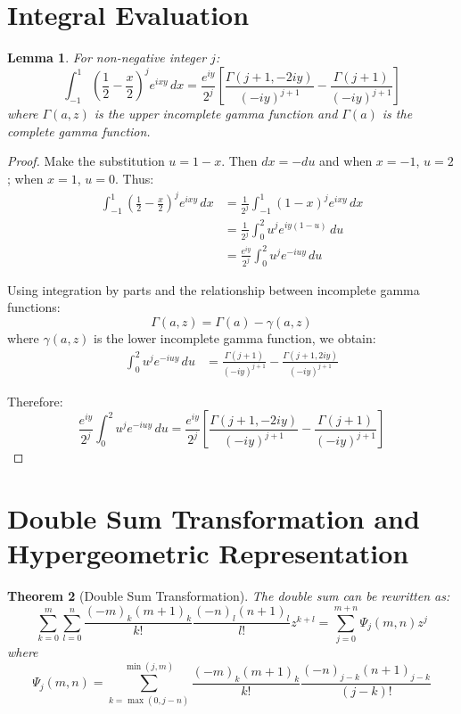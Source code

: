 \documentclass[12pt]{article}
\newtheorem{theorem}{Theorem}
\newtheorem{lemma}[theorem]{Lemma}
\begin{document}
\section*{Integral Evaluation}

\begin{lemma}
For non-negative integer $j$:
\[
\int_{-1}^1 \left(\frac{1}{2} - \frac{x}{2}\right)^j e^{ixy} \, dx = 
\frac{e^{iy}}{2^j} \left[\frac{\Gamma(j+1,-2iy)}{(-iy)^{j+1}} - \frac{\Gamma(j+1)}{(-iy)^{j+1}}\right]
\]
where $\Gamma(a,z)$ is the upper incomplete gamma function and $\Gamma(a)$ is the complete gamma function.
\end{lemma}

\begin{proof}
Make the substitution $u = 1-x$. Then $dx = -du$ and when $x = -1$, $u = 2$; when $x = 1$, $u = 0$. Thus:
\begin{align*}
\int_{-1}^1 \left(\frac{1}{2} - \frac{x}{2}\right)^j e^{ixy} \, dx 
&= \frac{1}{2^j} \int_{-1}^1 (1-x)^j e^{ixy} \, dx \\
&= \frac{1}{2^j} \int_0^2 u^j e^{iy(1-u)} \, du \\
&= \frac{e^{iy}}{2^j} \int_0^2 u^j e^{-iuy} \, du
\end{align*}

Using integration by parts and the relationship between incomplete gamma functions:
\[
\Gamma(a,z) = \Gamma(a) - \gamma(a,z)
\]
where $\gamma(a,z)$ is the lower incomplete gamma function, we obtain:
\begin{align*}
\int_0^2 u^j e^{-iuy} \, du &= \frac{\Gamma(j+1)}{(-iy)^{j+1}} - \frac{\Gamma(j+1,2iy)}{(-iy)^{j+1}}
\end{align*}

Therefore:
\[
\frac{e^{iy}}{2^j} \int_0^2 u^j e^{-iuy} \, du = 
\frac{e^{iy}}{2^j} \left[\frac{\Gamma(j+1,-2iy)}{(-iy)^{j+1}} - \frac{\Gamma(j+1)}{(-iy)^{j+1}}\right]
\]
\end{proof}

\section*{Double Sum Transformation and Hypergeometric Representation}

\begin{theorem}[Double Sum Transformation]
The double sum can be rewritten as:
\[
\sum_{k=0}^m \sum_{l=0}^n \frac{(-m)_k (m+1)_k}{k!} \frac{(-n)_l (n+1)_l}{l!} z^{k+l}
= \sum_{j=0}^{m+n} \Psi_j(m,n) z^j
\]
where
\[
\Psi_j(m,n) = \sum_{k=\max(0,j-n)}^{\min(j,m)} 
\frac{(-m)_k (m+1)_k}{k!} 
\frac{(-n)_{j-k} (n+1)_{j-k}}{(j-k)!}
\]
\end{theorem}
\end{document}
